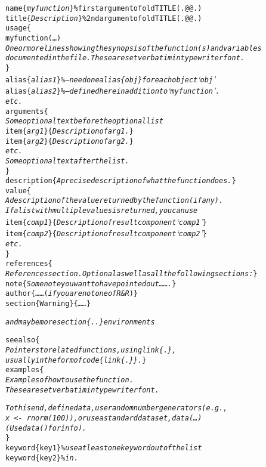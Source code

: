 \begin{display}
\begin{alltt}
\BS{}name\{\textit{myfunction}\}        \% first argument of old TITLE(. @@ .)
\BS{}title\{\textit{Description}\}      \% 2nd   argument of old TITLE(. @@ .)
\BS{}usage\{
myfunction(\dots)
\textit{One or more lines showing the synopsis of the function(s) and variables
documented in the file.  These are set verbatim in typewriter font.}
\}
\BS{}alias\{\textit{alias 1}\}     \%-- \textit{need one \texttt{\BS{}alias\{obj\}}  for each object `\texttt{obj}'}
\BS{}alias\{\textit{alias 2}\}     \%-- \textit{defined here in addition to `\texttt{myfunction}'.}
   \textit{etc.}
\BS{}arguments\{
 \textit{Some optional text \emph{before} the optional list}
 \BS{}item\{\textit{arg1}\}\{\textit{Description of arg1.}\}
 \BS{}item\{\textit{arg2}\}\{\textit{Description of arg2.}\}
    \textit{etc.}
 \textit{Some optional text \emph{after} the list.}
\}
\BS{}description\{\textit{A precise description of what the function does.}\}
\BS{}value\{
 \textit{A description of the value returned by the function (if any).
 If a list with  multiple values is returned, you can use} 
 \samepage\pagebreak[3]
 \BS{}item\{\textit{comp1}\}\{\textit{Description of result component `comp1'}\}
 \BS{}item\{\textit{comp2}\}\{\textit{Description of result component `comp2'}\}
    \textit{etc.}
 \}
\BS{}references\{
 \textit{References section.  Optional as well as all the following sections:}\}
\BS{}note\{ \textit{Some note you want to have pointed out\dots\dots.}\}
\BS{}author\{\dots\dots {\small(\textit{if you are not one of R \& R})}\}
\BS{}section\{Warning\}\{\textit{\dots\dots}\}

   \textit{and maybe more \texttt{\BS{}section\{..\}}  environments}

\BS{}seealso\{
 \textit{Pointers to related \R{} functions, using \texttt{\BS{}link\{.\}},
 usually in the form of \texttt{\BS{}code\{\BS{}link\{.\}\}}.} \}
\BS{}examples\{
 \textit{Examples of how to use the function.
 These are set verbatim in typewriter font.}

 \QQUAD{}
 \QQUAD\textit{To this end, define data, use random number generators (e.g.,
 \QQUAD  \texttt{x <- rnorm(100)}), or use a standard dataset, \texttt{data(\dots)}
 \QQUAD  (Use \texttt{data()} for info).}
\}
\BS{}keyword\{key1\}       \% \textit{use at least one  keyword out of the list}
\BS{}keyword\{key2\}       \% \textit{in } .
\end{alltt}
\end{display}

